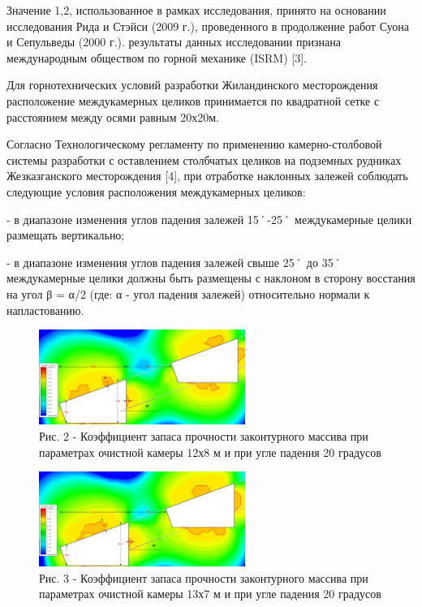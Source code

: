 \begin{multicols}{2}
Значение 1,2, использованное в рамках исследования, принято на основании
исследования Рида и Стэйси (2009 г.), проведенного в продолжение работ
Суона и Сепульведы (2000 г.). результаты данных исследовании признана
международным обществом по горной механике (ISRM) {[}3{]}.

Для горнотехнических условий разработки Жиландинского месторождения
расположение междукамерных целиков принимается по квадратной сетке с
расстоянием между осями равным 20х20м.

Согласно Технологическому регламенту по применению камерно-столбовой
системы разработки с оставлением столбчатых целиков на подземных
рудниках Жезказганского месторождения {[}4{]}, при отработке наклонных
залежей соблюдать следующие условия расположения междукамерных целиков:

- в диапазоне изменения углов падения залежей 15˚-25˚ междукамерные
целики размещать вертикально;

- в диапазоне изменения углов падения залежей свыше 25˚ до 35˚
междукамерные целики должны быть размещены с наклоном в сторону
восстания на угол β = α/2 (где: α - угол падения залежей) относительно
нормали к напластованию.
\end{multicols}

\begin{figure}[H]
	\centering
	\includegraphics[width=0.6\textwidth]{assets/283}
    \caption*{Рис. 2 - Коэффициент запаса прочности законтурного массива при параметрах очистной камеры 12х8 м и при угле падения 20 градусов}
\end{figure}

\begin{figure}[H]
	\centering
	\includegraphics[width=0.6\textwidth]{assets/284}
    \caption*{Рис. 3 - Коэффициент запаса прочности законтурного массива при параметрах очистной камеры 13х7 м и при угле падения 20 градусов}
\end{figure}

